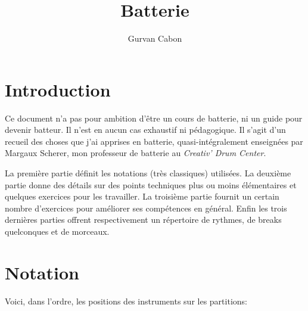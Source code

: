 \documentclass{article}
\title{Batterie}
\author{Gurvan Cabon}
\date{}
\begin{document}
\maketitle
\tableofcontents

\newpage
\section*{Introduction}
Ce document n'a pas pour ambition d'être un cours de batterie, ni un guide pour devenir batteur.
Il n'est en aucun cas exhaustif ni pédagogique. Il s'agit d'un recueil des choses que j'ai apprises en batterie, quasi-intégralement enseignées par Margaux Scherer, mon professeur de batterie au \emph{Creativ' Drum Center}.

La première partie définit les notations (très classiques) utilisées. La deuxième partie donne des détails sur des points techniques plus ou moins élémentaires et quelques exercices pour les travailler. La troisième partie fournit un certain nombre d'exercices pour améliorer ses compétences en général. Enfin les trois dernières parties offrent respectivement un répertoire de rythmes, de breaks quelconques et de morceaux.




\begin{comment}
tempalte de base personnalisé:


\begin{lilypond}

#(define mydrums '(
         (crashcymbal	cross			#f			6)
         (hihat			cross			#f			5)
         (openhihat		xcircle			#f			5)
         (himidtom		default			#f			3)
         (lowmidtom		default			#f			2)
         (snare			default			#f			1)
         (lowtom		default			#f			0)
         (bassdrum		default   		#f          -3)))


	\drums{
		\time 4/4
		\set Timing.beamExceptions = #'()
		\set DrumStaff.drumStyleTable = #(alist->hash-table mydrums)
		<<
			{}
			\\
			{}
		>>
		 
	}
\end{lilypond}



\end{comment}


\newpage
\section{Notation}

Voici, dans l'ordre, les positions des instruments sur les partitions:
\end{document}
